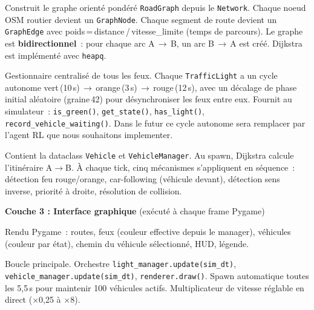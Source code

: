 \documentclass[a4paper,10pt]{article}
\begin{document}
\begin{description}[leftmargin=2em,itemsep=1pt]
  \item[\texttt{graph.py}] Construit le graphe orient\'{e} pond\'{e}r\'{e}
  \texttt{RoadGraph} depuis le \texttt{Network}. Chaque noeud OSM routier
  devient un \texttt{GraphNode}. Chaque segment de route devient un
  \texttt{GraphEdge} avec poids\,=\,distance\,/\,vitesse\_limite (temps de
  parcours). Le graphe est \textbf{bidirectionnel}~: pour chaque arc A\,$\to$\,B,
  un arc B\,$\to$\,A est cr\'{e}\'{e}. Dijkstra est impl\'{e}ment\'{e} avec \texttt{heapq}.

  \item[\texttt{simulation/lights.py}] Gestionnaire centralis\'{e} de
  tous les feux. Chaque \texttt{TrafficLight} a un cycle autonome
  vert\,(10\,s)\,$\to$\,orange\,(3\,s)\,$\to$\,rouge\,(12\,s),
  avec un d\'{e}calage de phase initial al\'{e}atoire (graine\,42) pour
  d\'{e}synchroniser les feux entre eux. Fournit au simulateur~:
  \texttt{is\_green()}, \texttt{get\_state()}, \texttt{has\_light()},
  \texttt{record\_vehicle\_waiting()}. Dans le futur ce cycle autonome sera remplacer par l'agent RL que nous souhaitons implementer.

  \item[\texttt{vehicle.py}]
  Contient la dataclass \texttt{Vehicle} et \texttt{VehicleManager}.
  Au spawn, Dijkstra calcule l'itin\'{e}raire A$\to$B.
  \`{A} chaque tick, cinq m\'{e}canismes s'appliquent en s\'{e}quence~:
  d\'{e}tection feu rouge/orange, car-following (v\'{e}hicule devant),
  d\'{e}tection sens inverse, priorit\'{e} \`{a} droite, r\'{e}solution de collision.
\end{description}

\medskip
\noindent\textbf{Couche 3 : Interface graphique}
(ex\'{e}cut\'{e} \`{a} chaque frame Pygame)

\begin{description}[leftmargin=2em,itemsep=1pt]
  \item[\texttt{renderer.py}] Rendu Pygame~: routes, feux (couleur
  effective depuis le manager), v\'{e}hicules (couleur par \'{e}tat), chemin
  du v\'{e}hicule s\'{e}lectionn\'{e}, HUD, l\'{e}gende.
  \item[\texttt{gui/app.py}] Boucle principale.
  Orchestre \texttt{light\_manager.update(sim\_dt)},
  \texttt{vehicle\_manager.update(sim\_dt)}, \texttt{renderer.draw()}.
  Spawn automatique toutes les 5,5\,s pour maintenir 100 v\'{e}hicules actifs.
  Multiplicateur de vitesse r\'{e}glable en direct ($\times$0,25
  \`{a} $\times$8).
\end{description}
\end{document}
